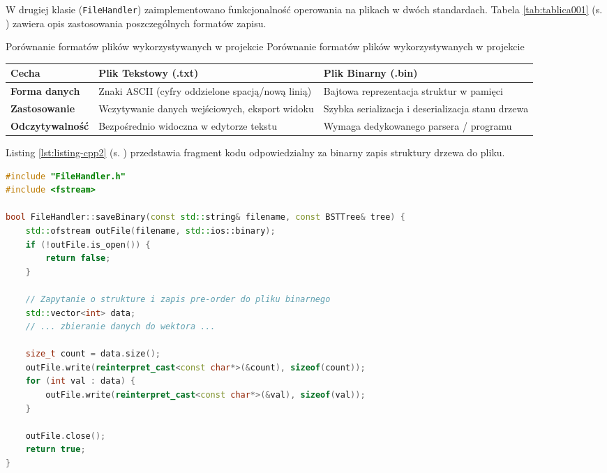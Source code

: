 \hspace{0.60cm}
W drugiej klasie (\texttt{FileHandler}) zaimplementowano funkcjonalność operowania na plikach w dwóch standardach. Tabela \ref{tab:tablica001} (s. \pageref{tab:tablica001}) zawiera opis zastosowania poszczególnych formatów zapisu.

\begin{tabela}
	{Porównanie formatów plików wykorzystywanych w projekcie}
	{Porównanie formatów plików wykorzystywanych w projekcie}
	{
		\begin{tabular}{|p{3.5cm}|p{4.5cm}|p{4.5cm}|} \hline
			\textbf{Cecha} & \textbf{Plik Tekstowy (.txt)} & \textbf{Plik Binarny (.bin)} \\ \hline
			\textbf{Forma danych} & Znaki ASCII (cyfry oddzielone spacją/nową linią) & Bajtowa reprezentacja struktur w pamięci \\ \hline
			\textbf{Zastosowanie} & Wczytywanie danych wejściowych, eksport widoku & Szybka serializacja i deserializacja stanu drzewa \\ \hline
			\textbf{Odczytywalność} & Bezpośrednio widoczna w edytorze tekstu & Wymaga dedykowanego parsera / programu \\ \hline
		\end{tabular}
	}
	\label{tab:tablica001}
\end{tabela}

\hspace{0.60cm}
Listing \ref{lst:listing-cpp2} (s. \pageref{lst:listing-cpp2}) przedstawia fragment kodu odpowiedzialny za binarny zapis struktury drzewa do pliku.

\begin{lstlisting}[caption=Zapis binarny węzłów drzewa BST do pliku, label={lst:listing-cpp2}, language=C++]
#include "FileHandler.h"
#include <fstream>

bool FileHandler::saveBinary(const std::string& filename, const BSTTree& tree) {
    std::ofstream outFile(filename, std::ios::binary);
    if (!outFile.is_open()) {
        return false;
    }
    
    // Zapytanie o strukture i zapis pre-order do pliku binarnego
    std::vector<int> data;
    // ... zbieranie danych do wektora ...
    
    size_t count = data.size();
    outFile.write(reinterpret_cast<const char*>(&count), sizeof(count));
    for (int val : data) {
        outFile.write(reinterpret_cast<const char*>(&val), sizeof(val));
    }
    
    outFile.close();
    return true;
}
\end{lstlisting}

